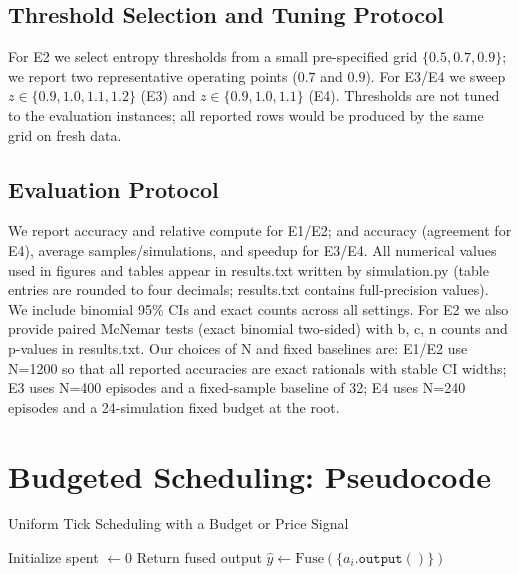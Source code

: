 \subsection{Threshold Selection and Tuning Protocol}
For E2 we select entropy thresholds from a small pre-specified grid $\{0.5, 0.7, 0.9\}$; we report two representative operating points ($0.7$ and $0.9$). For E3/E4 we sweep $z \in \{0.9, 1.0, 1.1, 1.2\}$ (E3) and $z \in \{0.9, 1.0, 1.1\}$ (E4). Thresholds are not tuned to the evaluation instances; all reported rows would be produced by the same grid on fresh data.

\subsection{Evaluation Protocol}
We report accuracy and relative compute for E1/E2; and accuracy (agreement for E4), average samples/simulations, and speedup for E3/E4. All numerical values used in figures and tables appear in results.txt written by simulation.py (table entries are rounded to four decimals; results.txt contains full-precision values). We include binomial 95\% CIs and exact counts across all settings. For E2 we also provide paired McNemar tests (exact binomial two-sided) with b, c, n counts and p-values in results.txt. Our choices of N and fixed baselines are: E1/E2 use N=1200 so that all reported accuracies are exact rationals with stable CI widths; E3 uses N=400 episodes and a fixed-sample baseline of 32; E4 uses N=240 episodes and a 24-simulation fixed budget at the root.

\section{Budgeted Scheduling: Pseudocode}
\label{sec:algo}
\begin{adjustbox}{width=\linewidth}
\begin{minipage}{\linewidth}
\begin{algorithm}[H]
\DontPrintSemicolon
\caption{Uniform Tick Scheduling with a Budget or Price Signal}
Initialize spent $\leftarrow 0$\;
Return fused output $\hat{y} \leftarrow \text{Fuse}(\{a_i.\texttt{output}()\})$\;
\end{algorithm}
\end{minipage}
\end{adjustbox}

